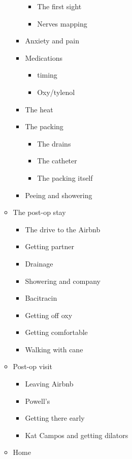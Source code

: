\begin{itemize}
\begin{itemize}
\begin{itemize}
      \begin{itemize}
      \tightlist
      \item
        The first sight
      \item
        Nerves mapping
      \end{itemize}
    \item
      Anxiety and pain
    \item
      Medications

      \begin{itemize}
      \tightlist
      \item
        timing
      \item
        Oxy/tylenol
      \end{itemize}
    \item
      The heat
    \item
      The packing

      \begin{itemize}
      \tightlist
      \item
        The drains
      \item
        The catheter
      \item
        The packing itself
      \end{itemize}
    \item
      Peeing and showering
    \end{itemize}
  \item
    The post-op stay

    \begin{itemize}
    \tightlist
    \item
      The drive to the Airbnb
    \item
      Getting partner
    \item
      Drainage
    \item
      Showering and company
    \item
      Bacitracin
    \item
      Getting off oxy
    \item
      Getting comfortable
    \item
      Walking with cane
    \end{itemize}
  \item
    Post-op visit

    \begin{itemize}
    \tightlist
    \item
      Leaving Airbnb
    \item
      Powell's
    \item
      Getting there early
    \item
      Kat Campos and getting dilators
    \end{itemize}
  \item
    Home


\end{itemize}
\end{itemize}
